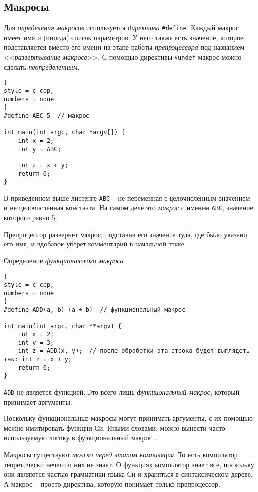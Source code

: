 \documentclass[%
	11pt,
	a4paper,
	utf8,
		]{article}
\begin{document}
\subsection{Макросы}

Для \emph{определения макросов} используется \emph{директива} \verb|#define|. Каждый макрос имеет имя и (иногда) список параметров. У него также есть значение, которое подставляется вместо его имени на этапе работы \emph{препроцессора} под названием <<\emph{развертывание макроса}>>. С помощью директивы \verb|#undef| макрос можно сделать \emph{неопределенным}.

\begin{lstlisting}[
style = c_cpp,
numbers = none
]
#define ABC 5  // макрос

int main(int argc, char *argv[]) {
    int x = 2;
    int y = ABC;
    
    int z = x + y;
    return 0;
}
\end{lstlisting}

В приведенном выше листенге \verb|ABC| -- не переменная с целочисленным значением и не целочисленная константа. На самом деле это \emph{макрос} с именем \verb|ABC|, значение которого равно 5.

Препроцессор развернет макрос, подставив его значение туда, где было указано его имя, и вдобавок уберет комментарий в начальной точке.

Определение \emph{функционального макроса}
\begin{lstlisting}[
style = c_cpp,
numbers = none
]
#define ADD(a, b) (a + b)  // функциональный макрос

int main(int argc, char **argv) {
    int x = 2;
    int y = 3;
    int z = ADD(x, y);  // после обработки эта строка будет выглядеть так: int z = x + y;
    return 0;
}
\end{lstlisting}

\verb|ADD| не является функцией. Это всего лишь \emph{функциональный макрос}, который принимает аргументы.

Поскольку функциональные макросы могут принимать аргументы, с их помощью можно имитировать функции Си. Иными словами, можно вынести часто используемую логику в функциональный макрос \cite[]{amini-extreme-c:2022}.

Макросы существуют \emph{только перед этапом компиляции}. То есть компилятор теоретически нечего о них не знает. О функциях компилятор знает все, поскольку они являются частью грамматики языка Си и храняться в синтаксическом дереве. А макрос -- просто директива, которую понимает только препроцессор.
\end{document}
